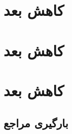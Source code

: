 \section{کاهش بعد}
\section{کاهش بعد}

\section{کاهش بعد}
\subsection{بارگیری مراجع}
















